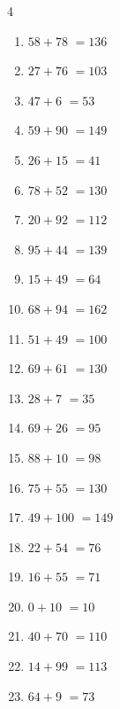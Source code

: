 \begin{multicols}{4}
\begin{enumerate}
  \item $58+78$
        $=136$

  \item $27+76$
        $=103$

\columnbreak %

  \item $47+6$
        $=53$

  \item $59+90$
        $=149$

  \item $26+15$
        $=41$

  \item $78+52$
        $=130$

  \item $20+92$
        $=112$

  \item $95+44$
        $=139$

  \item $15+49$
        $=64$

  \item $68+94$
        $=162$

  \item $51+49$
        $=100$

  \item $69+61$
        $=130$

  \item $28+7$
        $=35$

  \item $69+26$
        $=95$

  \item $88+10$
        $=98$

  \item $75+55$
        $=130$

  \item $49+100$
        $=149$

  \item $22+54$
        $=76$

  \item $16+55$
        $=71$

  \item $0+10$
        $=10$

  \item $40+70$
        $=110$

  \item $14+99$
        $=113$

  \item $64+9$
        $=73$


\end{enumerate}
\end{multicols}

